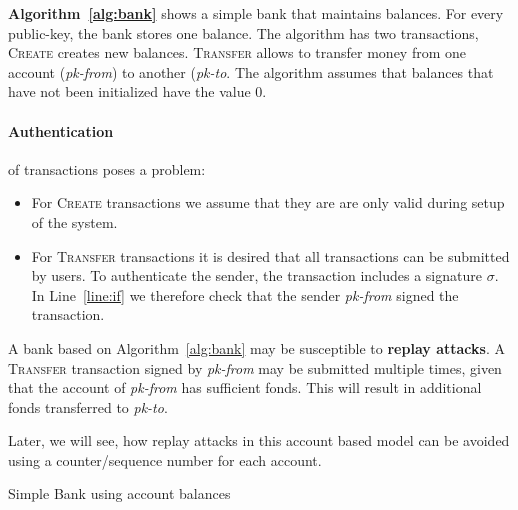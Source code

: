 \textbf{Algorithm~\ref{alg:bank}} shows a simple bank that maintains balances.
For every public-key, the bank stores one balance.
The algorithm has two transactions, \textsc{Create} creates new balances.
\textsc{Transfer} allows to transfer money from one account (\textit{pk-from}) to another (\textit{pk-to}.
The algorithm assumes that balances that have not been initialized have the value 0.


\paragraph{Authentication} of transactions poses a problem:
\begin{itemize}
	\item For \textsc{Create} transactions we assume that they are are only valid during setup of the system.
	\item For \textsc{Transfer} transactions it is desired that all transactions can be submitted by users. To authenticate the sender, the transaction includes a signature $\sigma$.
	In Line~\ref{line:if} we therefore check that the sender \textit{pk-from} signed the transaction.
\end{itemize}

\noindent
A bank based on Algorithm~\ref{alg:bank} may be susceptible to \textbf{replay attacks}. A \textsc{Transfer} transaction signed by \textit{pk-from} may be submitted multiple times, given that the account of \textit{pk-from} has sufficient fonds. This will result in additional fonds transferred to \textit{pk-to}.

Later, we will see, how replay attacks in this account based model can be avoided using a counter/sequence number for each account.


\begin{algorithm}[ht!]
	\caption{Simple Bank using account balances}
	\label{alg:bank}
	\begin{algorithmic}[1]
			
			
		\EndProcedure
				\EndIf
			\EndIf
		\EndProcedure
	\end{algorithmic}
\end{algorithm}

